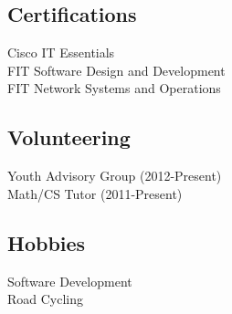 \documentclass[]{deedy-resume-openfont}
\begin{document}
\begin{minipage}[t]{0.33\textwidth}
\subsection{Certifications}
\textbullet{} Cisco IT Essentials\\
\textbullet{} FIT Software Design and Development \\
\textbullet{} FIT Network Systems and Operations \\
\sectionsep
\vspace{2mm}


\subsection{Volunteering}
\textbullet{} Youth Advisory Group (2012-Present)\\
\textbullet{} Math/CS Tutor (2011-Present)\\
\vspace{2mm}

\subsection{Hobbies}
\textbullet{} Software Development\\
\textbullet{} Road Cycling\\

\vspace{2mm}


\end{minipage}
\end{document}
